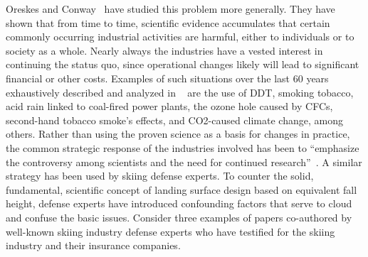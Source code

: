 \documentclass[smallextended]{svjour3}       %
\begin{document}
Oreskes and Conway~\cite{Oreskes2010} have studied this problem more generally.
They have shown that from time to time, scientific evidence accumulates that
certain commonly occurring industrial activities are harmful, either to
individuals or to society as a whole. Nearly always the industries have a
vested interest in continuing the status quo, since operational changes likely
will lead to significant financial or other costs. Examples of such situations
over the last 60 years exhaustively described and analyzed in
~\cite{Oreskes2010} are the use of DDT, smoking tobacco, acid rain linked to
coal-fired power plants, the ozone hole caused by CFCs, second-hand tobacco
smoke’s effects, and CO2-caused climate change, among others. Rather than using
the proven science as a basis for changes in practice, the common strategic
response of the industries involved has been to “emphasize the controversy
among scientists and the need for continued research”~\cite{Oreskes2010}. A
similar strategy has been used by skiing defense experts. To counter the solid,
fundamental, scientific concept of landing surface design based on equivalent
fall height, defense experts have introduced confounding factors that serve to
cloud and confuse the basic issues.  Consider three examples of papers
co-authored by well-known skiing industry defense experts who have testified
for the skiing industry and their insurance companies.

\end{document}
